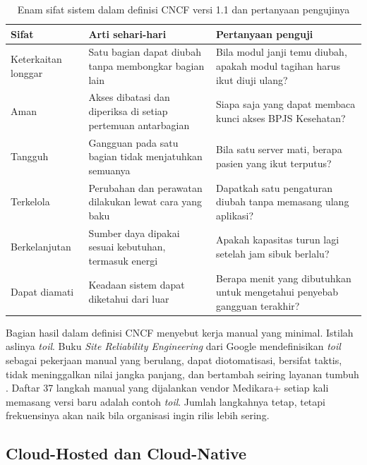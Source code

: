 \begin{table}[!htb]
  \centering
  \footnotesize
  \caption{Enam sifat sistem dalam definisi CNCF versi 1.1 dan pertanyaan pengujinya}
  \label{tab:ch05-sifat}
  \begin{tabularx}{\textwidth}{>{\raggedright\arraybackslash}p{2.1cm}
    >{\raggedright\arraybackslash}X >{\raggedright\arraybackslash}X}
    \hline
    \textbf{Sifat} & \textbf{Arti sehari-hari} & \textbf{Pertanyaan penguji} \\
    \hline
    Keterkaitan longgar & Satu bagian dapat diubah tanpa membongkar bagian lain & Bila
      modul janji temu diubah, apakah modul tagihan harus ikut diuji ulang? \\
    \hline
    Aman & Akses dibatasi dan diperiksa di setiap pertemuan antarbagian & Siapa saja yang
      dapat membaca kunci akses BPJS Kesehatan? \\
    \hline
    Tangguh & Gangguan pada satu bagian tidak menjatuhkan semuanya & Bila satu server
      mati, berapa pasien yang ikut terputus? \\
    \hline
    Terkelola & Perubahan dan perawatan dilakukan lewat cara yang baku & Dapatkah satu
      pengaturan diubah tanpa memasang ulang aplikasi? \\
    \hline
    Berkelanjutan & Sumber daya dipakai sesuai kebutuhan, termasuk energi & Apakah
      kapasitas turun lagi setelah jam sibuk berlalu? \\
    \hline
    Dapat diamati & Keadaan sistem dapat diketahui dari luar & Berapa menit yang dibutuhkan
      untuk mengetahui penyebab gangguan terakhir? \\
    \hline
  \end{tabularx}
\end{table}

Bagian hasil dalam definisi CNCF menyebut kerja manual yang minimal. Istilah aslinya
\textit{toil}. Buku \textit{Site Reliability Engineering} dari Google mendefinisikan
\textit{toil} sebagai pekerjaan manual yang berulang, dapat diotomatisasi, bersifat taktis,
tidak meninggalkan nilai jangka panjang, dan bertambah seiring layanan tumbuh
\cite{beyer2016}. Daftar 37 langkah manual yang dijalankan vendor Medikara+ setiap kali
memasang versi baru adalah contoh \textit{toil}. Jumlah langkahnya tetap, tetapi
frekuensinya akan naik bila organisasi ingin rilis lebih sering.

\subsection{Cloud-Hosted dan Cloud-Native}

